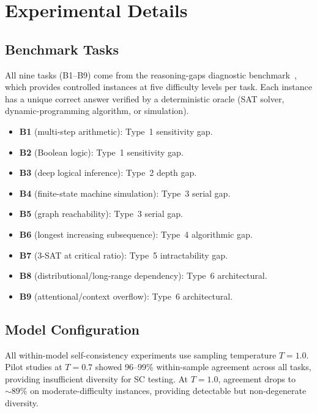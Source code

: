 \documentclass{article}
\theoremstyle{definition}
\theoremstyle{remark}
\begin{document}
\section{Experimental Details}
\label{app:experiments}

\subsection{Benchmark Tasks}

All nine tasks (B1--B9) come from the reasoning-gaps diagnostic benchmark~\citep{reasoninggaps2026}, which provides controlled instances at five difficulty levels per task.
Each instance has a unique correct answer verified by a deterministic oracle (SAT solver, dynamic-programming algorithm, or simulation).
\begin{itemize}[leftmargin=*,itemsep=1pt]
    \item \textbf{B1} (multi-step arithmetic): Type~1 sensitivity gap.
    \item \textbf{B2} (Boolean logic): Type~1 sensitivity gap.
    \item \textbf{B3} (deep logical inference): Type~2 depth gap.
    \item \textbf{B4} (finite-state machine simulation): Type~3 serial gap.
    \item \textbf{B5} (graph reachability): Type~3 serial gap.
    \item \textbf{B6} (longest increasing subsequence): Type~4 algorithmic gap.
    \item \textbf{B7} (3-SAT at critical ratio): Type~5 intractability gap.
    \item \textbf{B8} (distributional/long-range dependency): Type~6 architectural.
    \item \textbf{B9} (attentional/context overflow): Type~6 architectural.
\end{itemize}

\subsection{Model Configuration}

All within-model self-consistency experiments use sampling temperature $T = 1.0$.
Pilot studies at $T = 0.7$ showed 96--99\% within-sample agreement across all tasks, providing insufficient diversity for SC testing.
At $T = 1.0$, agreement drops to ${\sim}89\%$ on moderate-difficulty instances, providing detectable but non-degenerate diversity.
\end{document}
